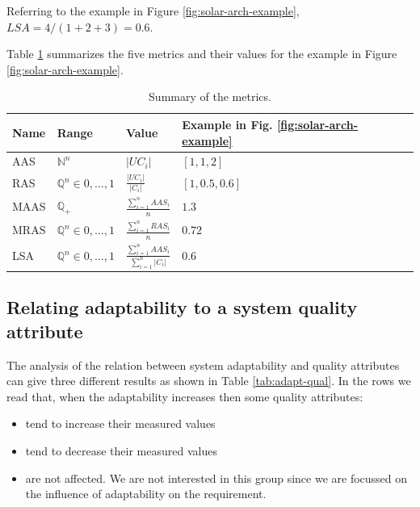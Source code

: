 \noindent Referring to the example in Figure \ref{fig:solar-arch-example}, $LSA = 4/(1 + 2 + 3) = 0.6$.

Table \ref{tab:solar-metrics-summary} summarizes the five metrics and their values for the example in Figure \ref{fig:solar-arch-example}.

\begin{table}[ht!b]
	\centering
	\begin{tabular}{|l|l|l|l|}
		\hline 
		Name & Range & Value & Example in Fig. \ref{fig:solar-arch-example} \\ 
		\hline 
		AAS & $\mathbb{N}^n$ & ${|UC_i|}$ & $[1,1,2]$ \\

		RAS & $\mathbb{Q}^n \in {0,\dots,1}$ & ${\frac{|UC_i|}{|C_i|}}$ & $[1,0.5,0.6]$ \\ 

		MAAS & $\mathbb{Q}_+$ & $\frac{\sum_{i=1}^{n}AAS_i}{n}$ & $1.3$ \\ 

		MRAS & $\mathbb{Q}^n \in {0,\dots,1}$ & $\frac{\sum_{i=1}^{n}RAS_i}{n}$ & $0.72$ \\ 
		
		LSA & $\mathbb{Q}^n \in {0,\dots,1}$ & $\frac{\sum_{i=1}^{n}AAS_i}{\sum_{i=1}^{n}|C_i|}$ & $0.6$ \\
		\hline 
		
	\end{tabular} 
	\caption[SOLAR Metrics]{Summary of the metrics.\cite{solar}}
	\label{tab:solar-metrics-summary}
\end{table}

\subsection{Relating adaptability to a system quality attribute}
The analysis of the relation between system adaptability and quality attributes can give three different results as shown in Table \ref{tab:adapt-qual}.  In the rows we read that, when the adaptability increases then some quality attributes:
\begin{itemize}
	\item tend to increase their measured values
	\item tend to decrease their measured values
	\item are not affected. We are not interested in this group since we are focussed on the influence of adaptability on the requirement.
\end{itemize}

